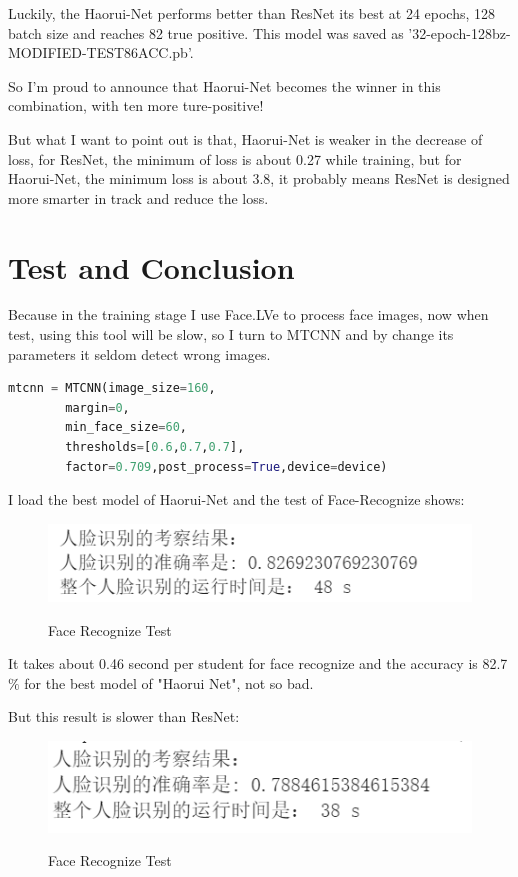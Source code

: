 \documentclass{article}
\begin{document}
Luckily, the Haorui-Net performs better than ResNet its best at 24 epochs, 128 batch size and reaches 82 true positive. This model was saved as  '32-epoch-128bz-MODIFIED-TEST86ACC.pb'.

So I'm proud to announce that Haorui-Net becomes the winner in this combination, with ten more ture-positive!

But what I want to point out is that, Haorui-Net is weaker in the decrease of loss, for ResNet, the minimum of loss is about 0.27 while training, but for Haorui-Net, the minimum loss is about 3.8, it probably means ResNet is designed more smarter in track and reduce the loss.

\section{Test and Conclusion}
Because in the training stage I use Face.LVe to process face images, now when test, using this tool will be slow, so I turn to MTCNN and by change its parameters it seldom detect wrong images.
\begin{lstlisting}[language=Python, caption=MTCNN Parameter]
mtcnn = MTCNN(image_size=160, 
        margin=0,
        min_face_size=60,
        thresholds=[0.6,0.7,0.7],
        factor=0.709,post_process=True,device=device)
\end{lstlisting}
I load the best model of Haorui-Net and the test of Face-Recognize shows:
\begin{figure}[H]%
  \centering
  \caption{Face Recognize Test}
  \includegraphics[width=50ex]{IMG/新人脸识别测试.png} %
  \label{Fig.RNN} %
\end{figure}
It takes about 0.46 second per student for face recognize and the accuracy is 82.7$\%$ for the best model of "Haorui Net", not so bad.

But this result is slower than ResNet:
\begin{figure}[H]%
  \centering
  \caption{Face Recognize Test}
  \includegraphics[width=50ex]{IMG/人脸识别测试2.png} %
  \label{Fig.RNN} %
\end{figure}
\end{document}
